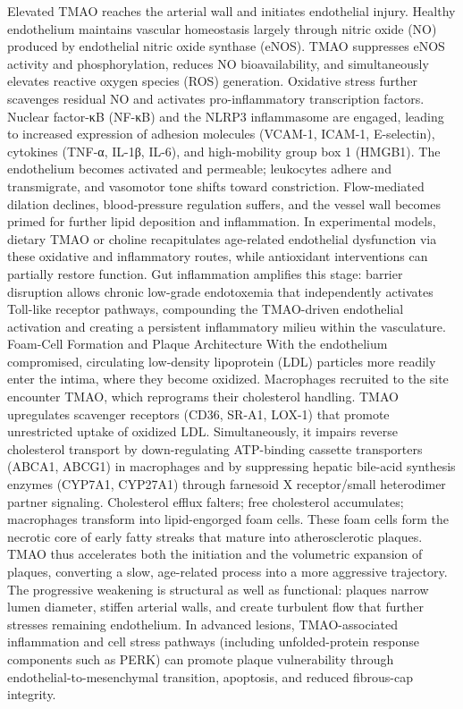 Elevated TMAO reaches the arterial wall and initiates endothelial injury. Healthy endothelium maintains vascular homeostasis largely through nitric oxide (NO) produced by endothelial nitric oxide synthase (eNOS). TMAO suppresses eNOS activity and phosphorylation, reduces NO bioavailability, and simultaneously elevates reactive oxygen species (ROS) generation. Oxidative stress further scavenges residual NO and activates pro-inflammatory transcription factors. Nuclear factor-κB (NF-κB) and the NLRP3 inflammasome are engaged, leading to increased expression of adhesion molecules (VCAM-1, ICAM-1, E-selectin), cytokines (TNF-α, IL-1β, IL-6), and high-mobility group box 1 (HMGB1). The endothelium becomes activated and permeable; leukocytes adhere and transmigrate, and vasomotor tone shifts toward constriction. Flow-mediated dilation declines, blood-pressure regulation suffers, and the vessel wall becomes primed for further lipid deposition and inflammation. In experimental models, dietary TMAO or choline recapitulates age-related endothelial dysfunction via these oxidative and inflammatory routes, while antioxidant interventions can partially restore function.
Gut inflammation amplifies this stage: barrier disruption allows chronic low-grade endotoxemia that independently activates Toll-like receptor pathways, compounding the TMAO-driven endothelial activation and creating a persistent inflammatory milieu within the vasculature.
Foam-Cell Formation and Plaque Architecture
With the endothelium compromised, circulating low-density lipoprotein (LDL) particles more readily enter the intima, where they become oxidized. Macrophages recruited to the site encounter TMAO, which reprograms their cholesterol handling. TMAO upregulates scavenger receptors (CD36, SR-A1, LOX-1) that promote unrestricted uptake of oxidized LDL. Simultaneously, it impairs reverse cholesterol transport by down-regulating ATP-binding cassette transporters (ABCA1, ABCG1) in macrophages and by suppressing hepatic bile-acid synthesis enzymes (CYP7A1, CYP27A1) through farnesoid X receptor/small heterodimer partner signaling. Cholesterol efflux falters; free cholesterol accumulates; macrophages transform into lipid-engorged foam cells. These foam cells form the necrotic core of early fatty streaks that mature into atherosclerotic plaques. TMAO thus accelerates both the initiation and the volumetric expansion of plaques, converting a slow, age-related process into a more aggressive trajectory.
The progressive weakening is structural as well as functional: plaques narrow lumen diameter, stiffen arterial walls, and create turbulent flow that further stresses remaining endothelium. In advanced lesions, TMAO-associated inflammation and cell stress pathways (including unfolded-protein response components such as PERK) can promote plaque vulnerability through endothelial-to-mesenchymal transition, apoptosis, and reduced fibrous-cap integrity.

